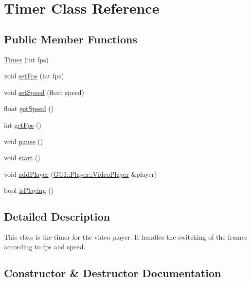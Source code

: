 \hypertarget{classGUI_1_1Player_1_1Timer}{}\section{Timer Class Reference}
\label{classGUI_1_1Player_1_1Timer}
\subsection*{Public Member Functions}
\begin{DoxyCompactItemize}
\item 
\hyperlink{classGUI_1_1Player_1_1Timer_ab333b697b20790f9c540b1c34f1a5eab}{Timer} (int fps)
\item 
void \hyperlink{classGUI_1_1Player_1_1Timer_a9913d8cd6d012c0ecfbc2de831d9d7cd}{set\+Fps} (int fps)
\item 
void \hyperlink{classGUI_1_1Player_1_1Timer_a5466c67c5ec22359c0702dc4ac8ffb19}{set\+Speed} (float speed)
\item 
float \hyperlink{classGUI_1_1Player_1_1Timer_a26ebefde7fe71954e6c1282255951b7d}{get\+Speed} ()
\item 
int \hyperlink{classGUI_1_1Player_1_1Timer_a519ad5c0664b9de28c1a6d9dc77f959d}{get\+Fps} ()
\item 
void \hyperlink{classGUI_1_1Player_1_1Timer_a7167f5c196fc5e167bfabde1a730e81d}{pause} ()
\item 
void \hyperlink{classGUI_1_1Player_1_1Timer_a60de64d75454385b23995437f1d72669}{start} ()
\item 
void \hyperlink{classGUI_1_1Player_1_1Timer_a9aa34416aa131e4a4c4b0a1eafc4b96c}{add\+Player} (\hyperlink{classGUI_1_1Player_1_1VideoPlayer}{G\+U\+I\+::\+Player\+::\+Video\+Player} \&player)
\item 
bool \hyperlink{classGUI_1_1Player_1_1Timer_a8438e3403946accc1986a05b89ee7b03}{is\+Playing} ()
\end{DoxyCompactItemize}


\subsection{Detailed Description}
This class is the timer for the video player. It handles the switching of the frames according to fps and speed. 

\subsection{Constructor \& Destructor Documentation}
\hypertarget{classGUI_1_1Player_1_1Timer_ab333b697b20790f9c540b1c34f1a5eab}{}
